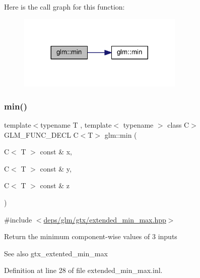 Here is the call graph for this function\+:
\nopagebreak
\begin{figure}[H]
\begin{center}
\leavevmode
\includegraphics[width=224pt]{df/d72/group__gtx__extended__min__max_ga74d1a96e7cdbac40f6d35142d3bcbbd4_cgraph}
\end{center}
\end{figure}
\mbox{\label{group__gtx__extended__min__max_ga42b5c3fc027fd3d9a50d2ccc9126d9f0}} 
\subsubsection{\texorpdfstring{min()}{min()}\hspace{0.1cm}{\footnotesize\ttfamily [3/6]}}
{\footnotesize\ttfamily template$<$typename T , template$<$ typename $>$ class C$>$ \\
G\+L\+M\+\_\+\+F\+U\+N\+C\+\_\+\+D\+E\+CL C$<$T$>$ glm\+::min (\begin{DoxyParamCaption}\item[{C$<$ T $>$ const \&}]{x,  }\item[{C$<$ T $>$ const \&}]{y,  }\item[{C$<$ T $>$ const \&}]{z }\end{DoxyParamCaption})}



{\ttfamily \#include $<$\hyperlink{extended__min__max_8hpp}{deps/glm/gtx/extended\+\_\+min\+\_\+max.\+hpp}$>$}

Return the minimum component-\/wise values of 3 inputs \begin{DoxySeeAlso}{See also}
gtx\+\_\+extented\+\_\+min\+\_\+max 
\end{DoxySeeAlso}


Definition at line 28 of file extended\+\_\+min\+\_\+max.\+inl.


